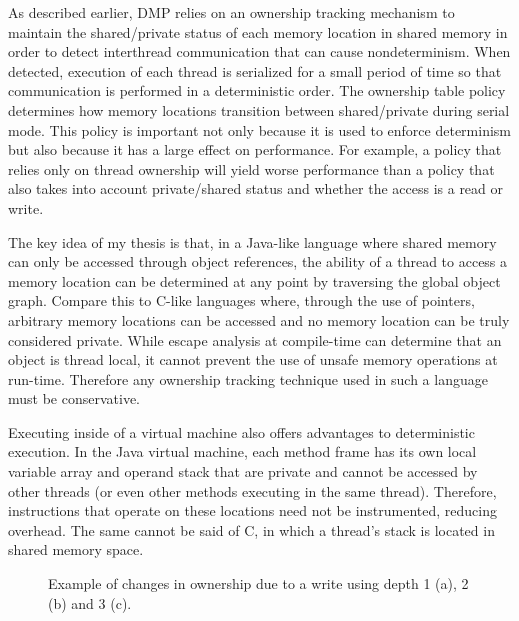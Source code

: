 As described earlier, DMP relies on an ownership tracking mechanism to
maintain the shared/private status of each memory location in shared
memory in order to detect interthread communication that can cause
nondeterminism.  When detected, execution of each thread is serialized
for a small period of time so that communication is performed in a
deterministic order.  The ownership table policy determines how memory
locations transition between shared/private during serial mode.  This
policy is important not only because it is used to enforce determinism
but also because it has a large effect on performance.  For example, a
policy that relies only on thread ownership will yield worse
performance than a policy that also takes into account private/shared
status and whether the access is a read or write.

The key idea of my thesis is that, in a Java-like language where
shared memory can only be accessed through object references, the
ability of a thread to access a memory location can be determined at
any point by traversing the global object graph.  Compare this to
C-like languages where, through the use of pointers, arbitrary memory
locations can be accessed and no memory location can be truly
considered private.  While escape analysis at compile-time can
determine that an object is thread local, it cannot prevent the use of
unsafe memory operations at run-time.  Therefore any ownership
tracking technique used in such a language must be conservative.

Executing inside of a virtual machine also offers advantages to
deterministic execution.  In the Java virtual machine, each method
frame has its own local variable array and operand stack that are
private and cannot be accessed by other threads (or even other methods
executing in the same thread).  Therefore, instructions that operate
on these locations need not be instrumented, reducing overhead.  The
same cannot be said of C, in which a thread's stack is located in
shared memory space.

\begin{figure}[t]
  \begin{center}
    {}
  \end{center}
  \caption{Example of changes in ownership due to a write using depth 1 (a), 2
    (b) and 3 (c).}
  \label{fig:depth}
\end{figure}


